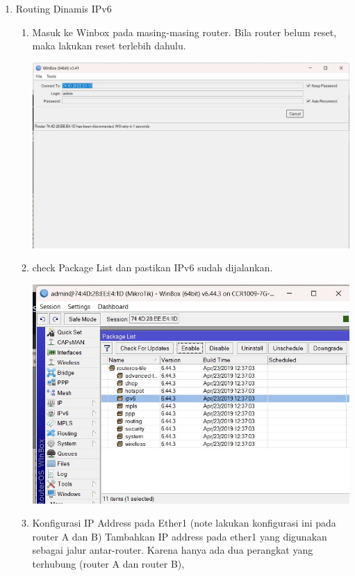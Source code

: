 \begin{enumerate}
\begin{enumerate}
    \end{enumerate}
    \item Routing Dinamis IPv6
    
    \begin{enumerate}
        \item Masuk ke Winbox pada masing-masing router. Bila 
        router belum reset, maka lakukan reset terlebih dahulu.

        \includegraphics[scale=0.2]{P1/img/1.jpg}

        \item check Package List dan pastikan IPv6 sudah dijalankan.
        
        \includegraphics[scale=0.4]{P1/img/3.jpg}

        \item Konfigurasi IP Address pada Ether1 (note lakukan 
        konfigurasi ini pada router A dan B) Tambahkan IP 
        address pada ether1 yang digunakan sebagai jalur 
        antar-router. Karena hanya ada dua perangkat yang terhubung 
        (router A dan router B),


\end{enumerate}
\end{enumerate}
